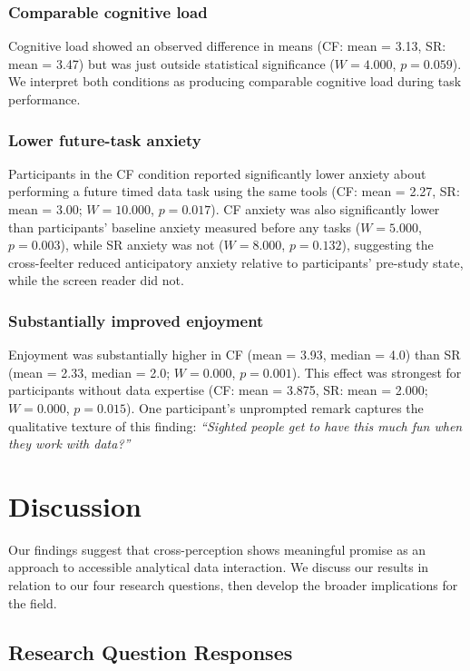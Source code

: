 \documentclass[12pt]{cmuthesis}
\begin{document}
\subsubsection{Comparable cognitive load}

Cognitive load showed an observed difference in means (CF: mean = 3.13, SR: mean = 3.47) but was just outside statistical significance ($W = 4.000$, $p = 0.059$). We interpret both conditions as producing comparable cognitive load during task performance.

\subsubsection{Lower future-task anxiety}

Participants in the CF condition reported significantly lower anxiety about performing a future timed data task using the same tools (CF: mean = 2.27, SR: mean = 3.00; $W = 10.000$, $p = 0.017$). CF anxiety was also significantly lower than participants' baseline anxiety measured before any tasks ($W = 5.000$, $p = 0.003$), while SR anxiety was not ($W = 8.000$, $p = 0.132$), suggesting the cross-feelter reduced anticipatory anxiety relative to participants' pre-study state, while the screen reader did not.

\subsubsection{Substantially improved enjoyment}

Enjoyment was substantially higher in CF (mean = 3.93, median = 4.0) than SR (mean = 2.33, median = 2.0; $W = 0.000$, $p = 0.001$). This effect was strongest for participants without data expertise (CF: mean = 3.875, SR: mean = 2.000; $W = 0.000$, $p = 0.015$). One participant's unprompted remark captures the qualitative texture of this finding: \textit{``Sighted people get to have this much fun when they work with data?''} 


\section{Discussion}
\label{sec:discussion}


Our findings suggest that cross-perception shows meaningful promise as an approach to accessible analytical data interaction. We discuss our results in relation to our four research questions, then develop the broader implications for the field. 


\subsection{Research Question Responses}
\label{sec:rq-responses}
\end{document}
